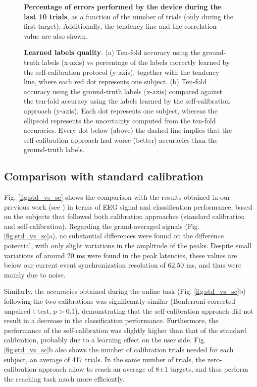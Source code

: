 \documentclass[10pt,letterpaper]{article}
\begin{document}
	\begin{figure*}[!ht]
		\centering	
		\caption{\label{fig:percentage_errors} \textbf{Percentage of errors performed by the device during the last 10 trials}, as a function of the number of trials (only during the first target). Additionally, the tendency line and the correlation value are also shown.}	
	\end{figure*}
	
	
	\begin{figure*}[!htbp]
		\centering
		\caption{\textbf{Learned labels quality}. (a) Ten-fold accuracy using the ground-truth labels (x-axis) vs percentage of the labels correctly learned by the self-calibration protocol (y-axis), together with the tendency line, where each red dot represents one subject. (b) Ten-fold accuracy using the ground-truth labels (x-axis) compared against the ten-fold accuracy using the labels learned by the self-calibration approach (y-axis). Each dot represents one subject, whereas the ellipsoid represents the uncertainty computed from the ten-fold accuracies. Every dot below (above) the dashed line implies that the self-calibration approach had worse (better) accuracies than the ground-truth labels.}
		\label{fig:labels}
	\end{figure*}
	
	\subsection{Comparison with standard calibration}
	
	Fig. \ref{fig:std_vs_sc} shows the comparison with the results obtained in our previous work (see \cite{iturrate13}) in terms of EEG signal and classification performance, based on the subjects that followed both calibration approaches (standard calibration and self-calibration). Regarding the grand-averaged signals (Fig. \ref{fig:std_vs_sc}a), no substantial differences were found on the difference potential, with only slight variations in the amplitude of the peaks. Despite small variations of around 20 ms were found in the peak latencies, these values are below our current event synchronization resolution of $62.50$ ms, and thus were mainly due to noise.
	
	Similarly, the accuracies obtained during the online task (Fig. \ref{fig:std_vs_sc}b) following the two calibrations was significantly similar (Bonferroni-corrected unpaired t-test, $p>0.1$), demonstrating that the self-calibration approach did not result in a decrease in the classification performance. Furthermore, the performance of the self-calibration was slightly higher than that of the standard calibration, probably due to a learning effect on the user side. Fig.  \ref{fig:std_vs_sc}b also shows the number of calibration trials needed for each subject, an average of 417 trials. In the same number of trials, the zero-calibration approach allow to reach an average of 8$\pm$1 targets, and thus perform the reaching task much more efficiently.
	
\end{document}
